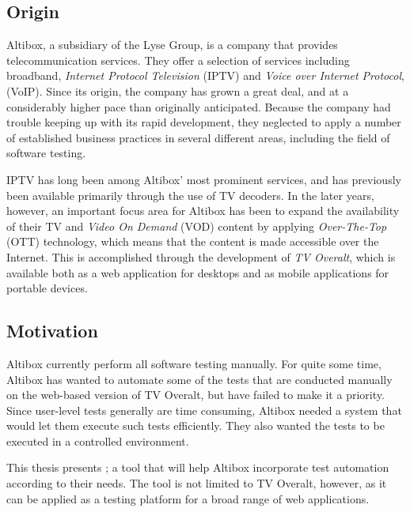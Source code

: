 \subsection{Origin} %
Altibox, a subsidiary of the Lyse Group, is a company that provides telecommunication services. They offer a selection of services including broadband, \emph{Internet Protocol Television} (IPTV) and \emph{Voice over Internet Protocol}, (VoIP). Since its origin, the company has grown a great deal, and at a considerably higher pace than originally anticipated. Because the company had trouble keeping up with its rapid development, they neglected to apply a number of established business practices in several different areas, including the field of software testing. 

IPTV has long been among Altibox' most prominent services, and has previously been available primarily through the use of TV decoders. In the later years, however, an important focus area for Altibox has been to expand the availability of their TV and \emph{Video On Demand} (VOD) content by applying \emph{Over-The-Top} (OTT) technology, which means that the content is made accessible over the Internet. This is accomplished through the development of \emph{TV Overalt}, which is available both as a web application for desktops and as mobile applications for portable devices.

\subsection{Motivation} %
Altibox currently perform all software testing manually. For quite some time, Altibox has wanted to automate some of the tests that are conducted manually on the web-based version of TV Overalt, but have failed to make it a priority. Since user-level tests generally are time consuming, Altibox needed a system that would let them execute such tests efficiently. They also wanted the tests to be executed in a controlled environment.

This thesis presents \toolname; a tool that will help Altibox incorporate test automation according to their needs. The tool is not limited to TV Overalt, however, as it can be applied as a testing platform for a broad range of web applications.


